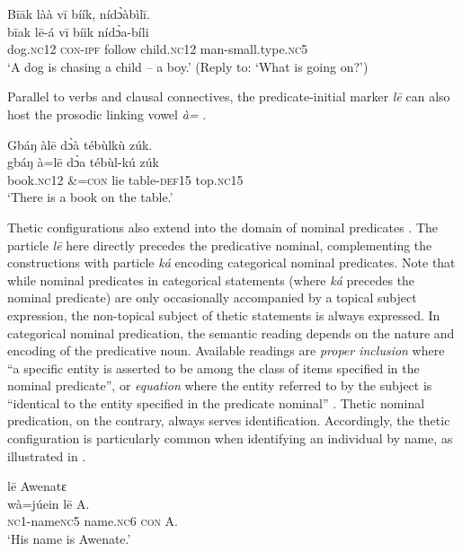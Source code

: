 \documentclass[output=paper]{langsci/langscibook}
\begin{document}
\ea\label{ex:schwarz:15}
\glll  B\={i}\={a}k    làà    v\={i}  bíík,    nídɔ̀àbìl\={i}.\\
    \textup{b\={i}ak}    l\={e}-á    v\={i}  bíik    {nídɔ̀a-bíli}\\
       dog.\textsc{nc}12  \textsc{con}-\textsc{ipf}  follow  child.\textsc{nc}12  man-small.type.\textsc{nc}5\\
\glt ‘A dog is chasing a child – a boy.’ (Reply to: ‘What is going on?’)
\z

Parallel to verbs and clausal connectives, the predicate-initial marker \textit{l\={e}} can also host the prosodic linking vowel \textit{à}\textit{=} .

\ea\label{ex:schwarz:16}
\glll   Gbáŋ    àl\={e}  d\`{ɔ}\`{a} tébùlkù    zúk.\\
    \textup{gbáŋ}    à=l\={e}   d\`{ɔ}a tébùl-kú  {zúk}\\
       book.\textsc{nc}12   \&=\textsc{con}  lie  table-\textsc{def}15  top.\textsc{nc}15\\
\glt ‘There is a book on the table.’
\z

Thetic configurations also extend into the domain of nominal predicates . The particle \textit{l\={e}} here directly precedes the predicative nominal, complementing the constructions with particle \textit{ká} encoding categorical nominal predicates. Note that while nominal predicates in categorical statements (where \textit{ká} precedes the nominal predicate) are only occasionally accompanied by a topical subject expression, the non-topical subject of thetic statements is always expressed. In categorical nominal predication, the semantic reading depends on the nature and encoding of the predicative noun. Available readings are \textit{proper inclusion} where “a specific entity is asserted to be among the class of items specified in the nominal predicate”, or \textit{equation} where the entity referred to by the subject is “identical to the entity specified in the predicate nominal” \citep[114]{Payne1997}. Thetic nominal predication, on the contrary, always serves identification. Accordingly, the thetic configuration is particularly common when identifying an individual by name, as illustrated in .

\ea\label{ex:schwarz:17}
    l\={e}   {Awenatɛ}\\
    \textup{w\`{a}}=júein    l\={e}   {A.}\\
     \textsc{nc}1-name\textsc{nc}5 name\textsc{.nc}6  \textsc{con}  A.\\
\glt ‘His name is Awenate.’
\z
\end{document}
